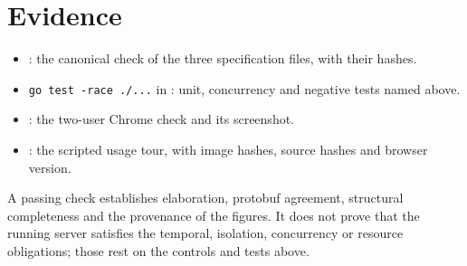\documentclass[11pt,oneside]{book}
\begin{document}
\section{Evidence}
\begin{itemize}
  \item {}: the canonical check
  of the three specification files, with their hashes.
  \item \texttt{go test -race ./...} in : unit, concurrency and
  negative tests named above.
  \item {}: the two-user Chrome check and its screenshot.
  \item {}: the scripted usage tour, with
  image hashes, source hashes and browser version.
\end{itemize}
A passing check establishes elaboration, protobuf agreement, structural
completeness and the provenance of the figures. It does not prove that the
running server satisfies the temporal, isolation, concurrency or resource
obligations; those rest on the controls and tests above.


\end{document}
